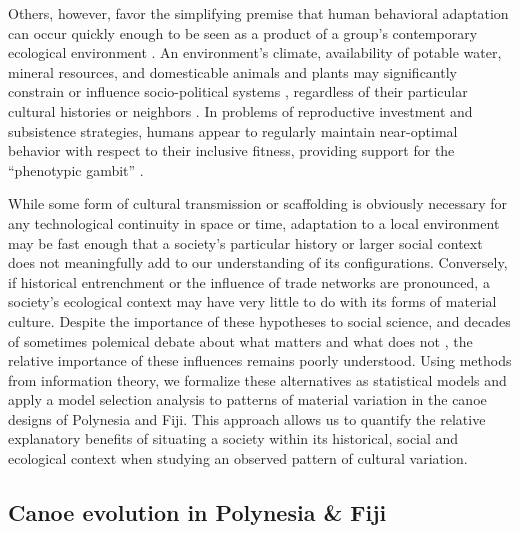 \documentclass[11pt]{article}
\begin{document}
Others, however, favor the simplifying premise that human behavioral adaptation can occur quickly enough to be seen as a product of a group's contemporary ecological environment \citep{Steward1955, Diamond2002domestication}. An environment's climate, availability of potable water, mineral resources, and domesticable animals and plants may significantly constrain or influence socio-political systems \citep{johnson2000evolution, Kirch2007}, regardless of their particular cultural histories or neighbors \citep{rogers1997phylogenetic, cashdan1997human}. In problems of reproductive investment and subsistence strategies, humans appear to regularly maintain near-optimal behavior with respect to their inclusive fitness, providing support for the ``phenotypic gambit'' \citep{WinterhalderSmith2000}. 

While some form of cultural transmission or scaffolding is obviously necessary for any technological continuity in space or time, adaptation to a local environment may be fast  enough that a society's particular history or larger social context does not meaningfully add to our understanding of its configurations. Conversely, if historical entrenchment or the influence of trade networks are pronounced, a society's ecological context may have very little to do with its forms of material culture. Despite the importance of these hypotheses to social science, and decades of sometimes polemical debate about what matters and what does not \citep{Harris1968, Sahlins1976:critiqueSociobiology,Betzig1997humannature}, the relative importance of these influences remains poorly understood. Using methods from information theory, we formalize these alternatives as statistical models and apply a model selection analysis to patterns of material variation in the canoe designs of Polynesia and Fiji. This approach allows us to quantify the relative explanatory benefits of situating a society within its historical, social and ecological context when studying an observed pattern of cultural variation.

\subsection{Canoe evolution in Polynesia \& Fiji}  
\end{document}
